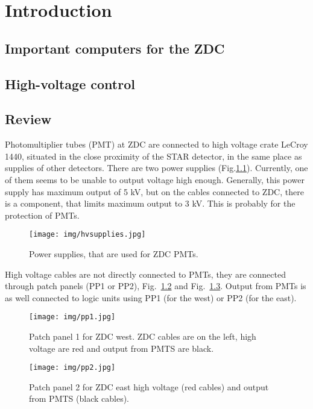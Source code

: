 \chapter{Introduction}
\section{Important computers for the ZDC}

\section{High-voltage control}

\section{Review}
Photomultiplier tubes (PMT) at ZDC are connected to high voltage crate LeCroy 1440, situated in the close proximity of the STAR detector, in the same place as supplies of other detectors. There are two power supplies (Fig.\ref{hvsupplies}). Currently, one of them seems to be unable to output voltage high enough. Generally, this power supply has maximum output of 5 kV, but on the cables connected to ZDC, there is a component, that limits maximum output to 3 kV. This is probably for the protection of PMTs.

\begin{figure}[htb]
\begin{center}
\texttt{[image: img/hvsupplies.jpg]}
\end{center}
\caption{Power supplies, that are used for ZDC PMTs.}
\label{hvsupplies}
\end{figure}

High voltage cables are not directly connected to PMTs, they are connected through patch panels (PP1 or PP2), Fig.~\ref{pp1} and Fig.~\ref{pp2}. Output from PMTs is as well connected to logic units using PP1 (for the west) or PP2 (for the east).

\begin{figure}[htb]
\begin{center}
\texttt{[image: img/pp1.jpg]}
\end{center}
\caption{Patch panel 1 for ZDC west.  ZDC cables are on the left, high voltage are red and output from PMTS are black.}
\label{pp1}
\end{figure}

\begin{figure}[htb]
\begin{center}
\texttt{[image: img/pp2.jpg]}
\end{center}
\caption{Patch panel 2 for ZDC east high voltage (red cables) and output from PMTS (black cables).}
\label{pp2}
\end{figure}

